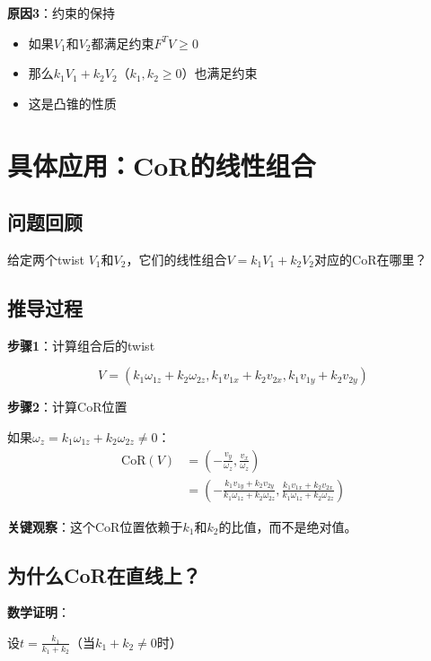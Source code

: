\documentclass[12pt,a4paper]{article}
\begin{document}
\textbf{原因3}：约束的保持

\begin{itemize}
\item 如果$V_1$和$V_2$都满足约束$F^T V \geq 0$
\item 那么$k_1 V_1 + k_2 V_2$（$k_1, k_2 \geq 0$）也满足约束
\item 这是凸锥的性质
\end{itemize}

\section{具体应用：CoR的线性组合}

\subsection{问题回顾}

给定两个twist $V_1$和$V_2$，它们的线性组合$V = k_1 V_1 + k_2 V_2$对应的CoR在哪里？

\subsection{推导过程}

\textbf{步骤1}：计算组合后的twist

\begin{equation}
V = (k_1 \omega_{1z} + k_2 \omega_{2z}, k_1 v_{1x} + k_2 v_{2x}, k_1 v_{1y} + k_2 v_{2y})
\end{equation}

\textbf{步骤2}：计算CoR位置

如果$\omega_z = k_1 \omega_{1z} + k_2 \omega_{2z} \neq 0$：
\begin{align}
\text{CoR}(V) &= \left(-\frac{v_y}{\omega_z}, \frac{v_x}{\omega_z}\right) \\
&= \left(-\frac{k_1 v_{1y} + k_2 v_{2y}}{k_1 \omega_{1z} + k_2 \omega_{2z}}, \frac{k_1 v_{1x} + k_2 v_{2x}}{k_1 \omega_{1z} + k_2 \omega_{2z}}\right)
\end{align}

\textbf{关键观察}：这个CoR位置依赖于$k_1$和$k_2$的比值，而不是绝对值。

\subsection{为什么CoR在直线上？}

\textbf{数学证明}：

设$t = \frac{k_1}{k_1 + k_2}$（当$k_1 + k_2 \neq 0$时）
\end{document}
